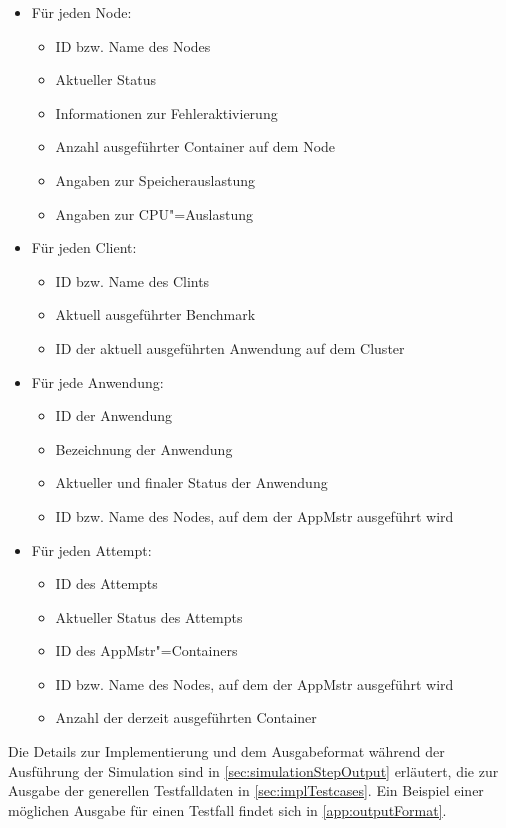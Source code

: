 \begin{itemize}
    \item Für jeden Node:
    \begin{itemize}
        \item ID bzw. Name des Nodes
        \item Aktueller Status
        \item Informationen zur Fehleraktivierung
        \item Anzahl ausgeführter Container auf dem Node
        \item Angaben zur Speicherauslastung
        \item Angaben zur CPU"=Auslastung
    \end{itemize}
    
    \item Für jeden Client:
    \begin{itemize}
        \item ID bzw. Name des Clints
        \item Aktuell ausgeführter Benchmark
        \item ID der aktuell ausgeführten Anwendung auf dem Cluster
    \end{itemize}

    \item Für jede Anwendung:
    \begin{itemize}
        \item ID der Anwendung
        \item Bezeichnung der Anwendung
        \item Aktueller und finaler Status der Anwendung
        \item ID bzw. Name des Nodes, auf dem der \ac{AppMstr} ausgeführt wird
    \end{itemize}

    \item Für jeden Attempt:
    \begin{itemize}
        \item ID des Attempts
        \item Aktueller Status des Attempts
        \item ID des \ac{AppMstr}"=Containers
        \item ID bzw. Name des Nodes, auf dem der \ac{AppMstr} ausgeführt wird
        \item Anzahl der derzeit ausgeführten Container
    \end{itemize}
\end{itemize}

Die Details zur Implementierung und dem Ausgabeformat während der Ausführung der Simulation sind in \autoref{sec:simulationStepOutput} erläutert, die zur Ausgabe der generellen Testfalldaten in \autoref{sec:implTestcases}. Ein Beispiel einer möglichen Ausgabe für einen Testfall findet sich in \autoref{app:outputFormat}.
